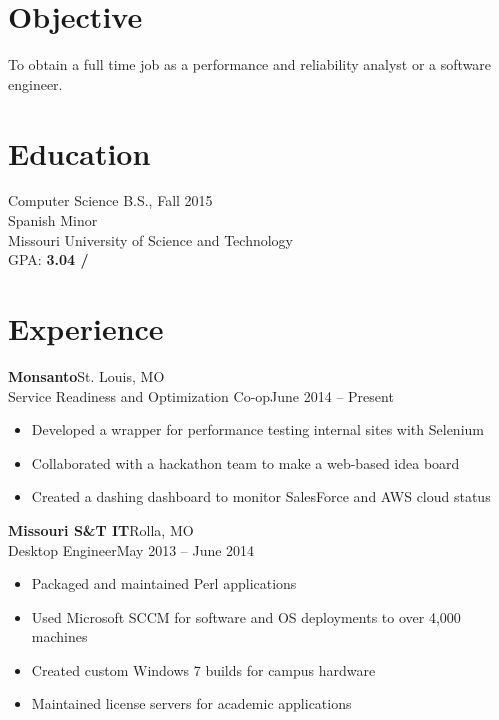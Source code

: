 \documentclass[margin]{res}
\begin{document}
  \begin{resume} 
   
    \section{Objective} 
    To obtain a full time job as a performance and reliability analyst or a software engineer.

    \section{Education} 
      Computer Science B.S., Fall 2015 \\
      Spanish Minor \\
      Missouri University of Science and Technology \\
      GPA: {\bf 3.04 \slash {}}

    \section{Experience}
       \textbf{Monsanto}\hfill St. Louis, MO\\
       Service Readiness and Optimization Co-op\hfill June 2014 -- Present
       \begin{itemize} \itemsep -1pt  %
         \item Developed a wrapper for performance testing internal sites with Selenium
         \item Collaborated with a hackathon team to make a web-based idea board 
         \item Created a dashing dashboard to monitor SalesForce and AWS cloud status
       \end{itemize}
       \textbf{Missouri S\&T IT}\hfill Rolla, MO\\
       Desktop Engineer\hfill May 2013 -- June 2014
       \begin{itemize} \itemsep -1pt  %
         \item Packaged and maintained Perl applications
         \item Used Microsoft SCCM for software and OS deployments to over 4,000 machines
         \item Created custom Windows 7 builds for campus hardware
         \item Maintained license servers for academic applications
       \end{itemize}


\end{resume}
\end{document}
